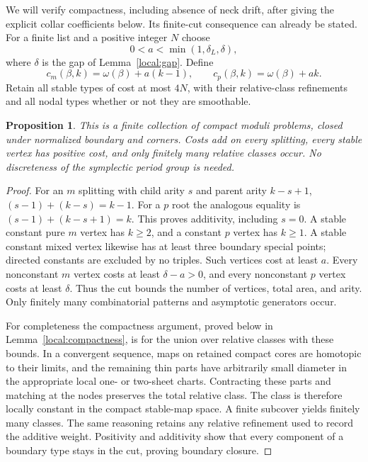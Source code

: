 \documentclass[11pt]{article}
\newtheorem{proposition}[theorem]{Proposition}
\theoremstyle{definition}
\theoremstyle{remark}
\numberwithin{equation}{section}
\begin{document}
We will verify compactness, including absence of neck drift, after giving
the explicit collar coefficients below.  Its finite-cut consequence can
already be stated.  For a finite list and a positive integer $N$ choose
\[
 0<a<\min(1,\delta_L,\delta),
\]
where $\delta$ is the gap of Lemma~\ref{local:gap}.  Define
\begin{equation}\label{local:cost}
 c_m(\beta,k)=\omega(\beta)+a(k-1),\qquad
 c_p(\beta,k)=\omega(\beta)+ak.
\end{equation}
Retain all stable types of cost at most $4N$, with their relative-class
refinements and all nodal types whether or not they are smoothable.

\begin{proposition}\label{local:finite}
This is a finite collection of compact moduli problems, closed under
normalized boundary and corners.  Costs add on every splitting, every
stable vertex has positive cost, and only finitely many relative classes
occur.  No discreteness of the symplectic period group is needed.
\end{proposition}
\begin{proof}
For an $m$ splitting with child arity $s$ and parent arity $k-s+1$,
$(s-1)+(k-s)=k-1$.  For a $p$ root the analogous equality is
$(s-1)+(k-s+1)=k$.  This proves additivity, including $s=0$.
A stable constant pure $m$ vertex has $k\geq2$, and a constant $p$
vertex has $k\geq1$.  A stable constant mixed vertex likewise has at
least three boundary special points; directed constants are excluded
by no triples.  Such vertices cost at least $a$.  Every nonconstant
$m$ vertex costs at least $\delta-a>0$, and every nonconstant $p$
vertex costs at least $\delta$.  Thus the cut bounds the number of
vertices, total area, and arity.  Only finitely many combinatorial
patterns and asymptotic generators occur.

For completeness the compactness argument, proved below in
Lemma~\ref{local:compactness}, is for the union over relative classes
with these bounds.  In a convergent sequence, maps on retained compact
cores are homotopic to their limits, and the remaining thin parts
have arbitrarily small diameter in the appropriate local one- or
two-sheet charts.  Contracting these parts and matching at the nodes
preserves the total relative class.  The class is therefore locally
constant in the compact stable-map space.  A finite subcover yields
finitely many classes.  The same reasoning retains any relative
refinement used to record the additive weight.  Positivity and
additivity show that every component of a boundary type stays in the
cut, proving boundary closure.
\end{proof}
\end{document}
